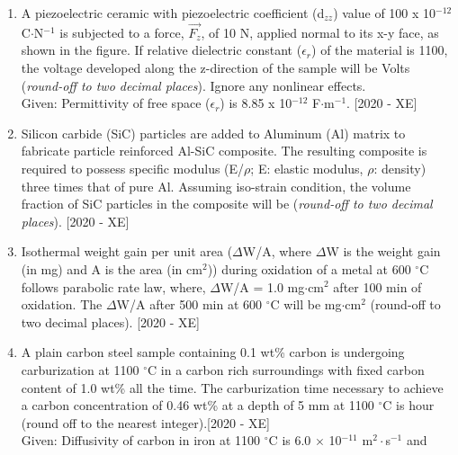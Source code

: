 \documentclass[journal]{IEEEtran}
\begin{document}
\begin{enumerate}
    \item A piezoelectric ceramic with piezoelectric coefficient (d$_{zz}$) value of 100 x 10$^{-12}$ C$\cdot$N$^{-1}$ is subjected to a force, $\vec{F_z}$, of 10 N, applied normal to its x-y face, as shown in the figure. If relative dielectric constant ($\epsilon_r$) of the material is 1100, the voltage developed along the z-direction of the sample will be Volts \underline{\hspace{3cm}}(\textit{round-off to two decimal places}). Ignore any nonlinear effects.\\
    Given: Permittivity of free space ($\epsilon_r$) is 8.85 x 10$^{-12}$ F$\cdot$m$^{-1}$. \hfill{[2020 - XE]}
    

    \item Silicon carbide (SiC) particles are added to Aluminum (Al) matrix to fabricate particle reinforced Al-SiC composite. The resulting composite is required to possess specific modulus (E/$\rho$; E: elastic modulus, $\rho$: density) three times that of pure Al. Assuming iso-strain condition, the volume fraction of SiC particles in the composite will be (\textit{round-off to two decimal places}). \hfill{[2020 - XE]}
    \begin{table}[h]
        \centering
        
    \end{table}
    \item Isothermal weight gain per unit area ($\Delta$W/A, where $\Delta$W is the weight gain (in mg) and A is the area (in cm$^2$)) during oxidation of a metal at 600 $^\circ$C follows parabolic rate law, where, $\Delta$W/A = 1.0 mg$\cdot$cm$^2$ after 100 min of oxidation. The $\Delta$W/A after 500 min at 600 $^\circ$C will be mg$\cdot$cm$^2$ (round-off to two decimal places). \hfill{[2020 - XE]}
    \item A plain carbon steel sample containing 0.1 wt\% carbon is undergoing carburization at 1100 $^\circ$C in a carbon rich surroundings with fixed carbon content of 1.0 wt\% all the time. The carburization time necessary to achieve a carbon concentration of 0.46 wt\% at a depth of 5 mm at 1100 $^\circ$C is \underline{\hspace{3cm}}hour (round off to the nearest integer).\hfill{[2020 - XE]} \\
    Given: Diffusivity of carbon in iron at 1100 $^\circ$C is 6.0 $\times$ 10$^{-11}$ m$^2\cdot$s$^{-1}$ and 
    \begin{table}[h]
        \centering
        
    \end{table}
\end{enumerate}
\end{document}
